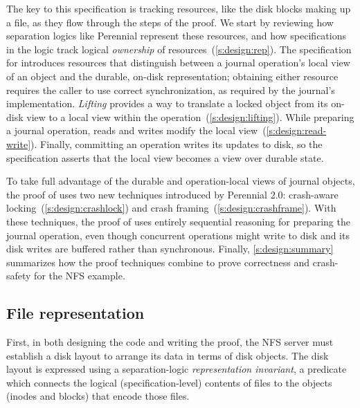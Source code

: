 The key to this specification is tracking resources, like the disk blocks making up a
file, as they flow through the steps of the proof. We start by reviewing how
separation logics like Perennial represent these resources, and how
specifications in the logic track logical \emph{ownership} of
resources~(\autoref{s:design:rep}). The specification for \txn introduces
resources that distinguish between a journal operation's local view of an object and
the durable, on-disk representation; obtaining either resource
requires the caller to use correct synchronization, as required by the journal's
implementation. \emph{Lifting} provides a
way to translate
a locked object from its on-disk view to a local view within the operation~(\autoref{s:design:lifting}).
While preparing a journal operation, reads and writes modify the local
view~(\autoref{s:design:read-write}). Finally, committing an operation writes
its updates to disk, so the specification asserts that the local
view becomes a view over durable state.

To take full advantage of the durable and operation-local views of
journal objects, the proof of  uses two new techniques introduced by
Perennial 2.0: crash-aware locking~(\autoref{s:design:crashlock}) and crash
framing~(\autoref{s:design:crashframe}). With these techniques, the proof of
 uses entirely sequential reasoning for preparing the
journal operation, even though concurrent operations might write to disk and its
disk writes are buffered rather than synchronous.
Finally, \autoref{s:design:summary} summarizes how the proof
techniques combine to prove correctness and crash-safety for the NFS 
example.


\subsection{File representation}
\label{s:design:rep}

First, in both designing the code and writing the proof, the NFS server must
establish a disk layout to arrange its data in terms of disk objects. The disk
layout is expressed using a separation-logic \emph{representation invariant}, a
predicate which connects the logical (specification-level) contents of files to the objects (inodes and
blocks) that encode those files.

